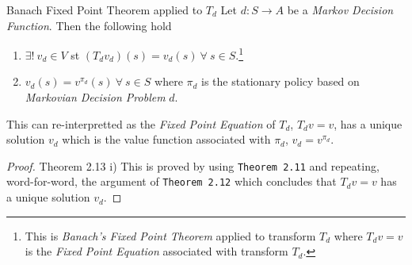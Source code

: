 \documentclass[11pt,a4paper]{article}
\begin{document}
  \begin{theorem}{Banach Fixed Point Theorem applied to $T_d$}
    Let $d:S\to A$ be a \textit{Markov Decision Function}. Then the following hold
    \begin{enumerate}
      \item $\exists!\ v_d\in V$ st $(T_dv_d)(s)=v_d(s)\ \forall\ s\in S$.\footnote{This is \textit{Banach's Fixed Point Theorem} applied to transform $T_d$ where $T_dv=v$ is the \textit{Fixed Point Equation} associated with transform $T_d$.}
      \item $v_d(s)=v^{\pi_d}(s)\ \forall\ s\in S$ where $\pi_d$ is the stationary policy based on \textit{Markovian Decision Problem} $d$.
    \end{enumerate}
    This can re-interpretted as the \textit{Fixed Point Equation} of $T_d$, $T_dv=v$, has a unique solution $v_d$ which is the value function associated with $\pi_d$, $v_d=v^{\pi_d}$.
  \end{theorem}

  \begin{proof}{Theorem 2.13 i)}
    This is proved by using \texttt{Theorem 2.11}  and repeating, word-for-word, the argument of \texttt{Theorem 2.12}  which concludes that $T_dv=v$ has a unique solution $v_d$.
  \end{proof}
\end{document}
